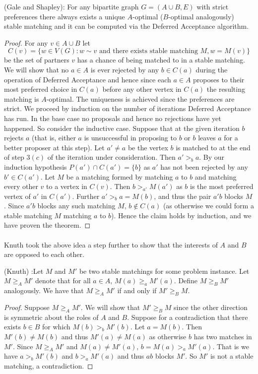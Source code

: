 \begin{theorem} (Gale and Shapley): For any bipartite graph $G = (A\cup B, E)$ with strict preferences there always exists a unique $A$-optimal ($B$-optimal analogously) stable matching and it can be computed via the Deferred Acceptance algorithm.
\end{theorem}
\begin{proof}
For any $v \in A\cup B$ let $$C(v) = \{w \in V(G) : w \sim v \text{ and there exists stable matching } M, w = M(v) \}$$ be the set of partners $v$ has a chance of being matched to in a stable matching. We will show that no $a \in A$ is ever rejected by any $b \in C(a)$ during the operation of Deferred Acceptance and hence since each $a \in A$ proposes to their most preferred choice in $C(a)$ before any other vertex in $C(a)$ the resulting matching is $A$-optimal. The uniqueness is achieved since the preferences are strict. We proceed by induction on the number of iterations Deferred Acceptance has run. In the base case no proposals and hence no rejections have yet happened. So consider the inductive case. Suppose that at the given iteration $b$ rejects $a$ (that is, either $a$ is unsuccessful in proposing to $b$ or $b$ leaves $a$ for a better proposer at this step). Let $a' \neq a$ be the vertex $b$ is matched to at the end of step $3(c)$ of the iteration under consideration. Then $a' >_b a$. By our induction hypothesis $P(a') \cap C(a') = \{b\}$ as $a'$ has not been rejected by any $b' \in C(a')$. Let $M$ be a matching formed by matching $a$ to $b$ and matching every other $v$ to a vertex in $C(v)$. Then $b >_{a'} M(a')$ as $b$ is the most preferred vertex of $a'$ in $C(a')$. Further $a' >_b a=M(b)$, and thus the pair $a'b$ blocks $M$. Since $a'b$ blocks any such matching $M$, $b \not\in C(a)$ (as otherwise we could form a stable matching $M$ matching $a$ to $b$). Hence the claim holds by induction, and we have proven the theorem. \end{proof}

\paragraph{} Knuth took the above idea a step further to show that the interests of $A$ and $B$ are opposed to each other. 

\begin{theorem} (Knuth) \cite{knuthmariages}:Let $M$ and $M'$ be two stable matchings for some problem instance. Let $M \geq_A M'$ denote that for all $a \in A$, $M(a) \geq_a M'(a)$. Define $M \geq_B M'$ analogously. We have that $M \geq_A M'$ if and only if $M' \geq_B M$.
\end{theorem}
\begin{proof}
Suppose $M \geq_A M'$. We will show that $M' \geq_B M$ since the other direction is symmetric about the roles of $A$ and $B$. Suppose for a contradiction that there exists $b \in B$ for which $M(b) >_b M'(b)$. Let $a = M(b)$. Then $M'(b) \neq M(b)$ and thus $M'(a) \neq M(a)$ as otherwise $b$ has two matches in $M'$. Since $M \geq_A M'$ and $M(a) \neq M'(a)$, $b=M(a) >_a M'(a)$. That is we have $a >_b M'(b)$ and $b >_a M'(a)$ and thus $ab$ blocks $M'$. So $M'$ is not a stable matching, a contradiction. \end{proof}

